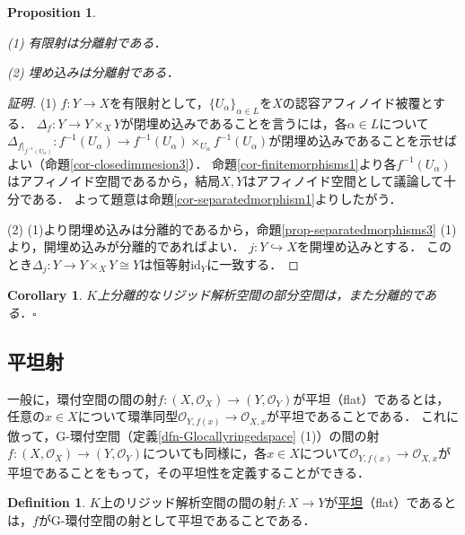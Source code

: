 \documentclass[a4paper,12pt, dvipdfmx]{jsbook}
\def\O{\mathscr{O}}
\def\id{\mathrm{id}}
\theoremstyle{plain}
\newtheorem{prop}[thm]{\bfseries Proposition}
\newtheorem{cor}[thm]{\bfseries Corollary}
\theoremstyle{definition}
\newtheorem{dfn}[thm]{\bfseries Definition}
\begin{document}
\begin{prop}\label{prop-separatedmorphisms4}{\rm
(1) 有限射は分離射である．

(2) 埋め込みは分離射である．}
\end{prop}

\begin{proof}[証明]
(1) $f\colon Y\rightarrow X$を有限射として，$\{U_{\alpha}\}_{\alpha\in L}$を$X$の認容アフィノイド被覆とする．
$\Delta_f\colon Y\rightarrow Y\times_XY$が閉埋め込みであることを言うには，各$\alpha\in L$について$\Delta_{f|_{f^{-1}(U_{\alpha})}}\colon f^{-1}(U_{\alpha})\rightarrow f^{-1}(U_{\alpha})\times_{U_{\alpha}}f^{-1}(U_{\alpha})$が閉埋め込みであることを示せばよい（命題\ref{cor-closedimmesion3}）．
命題\ref{cor-finitemorphisms1}より各$f^{-1}(U_{\alpha})$はアフィノイド空間であるから，結局$X,Y$はアフィノイド空間として議論して十分である．
よって題意は命題\ref{cor-separatedmorphism1}よりしたがう．

(2) (1)より閉埋め込みは分離的であるから，命題\ref{prop-separatedmorphisms3} (1)より，開埋め込みが分離的であればよい．
$j\colon Y\hookrightarrow X$を開埋め込みとする．
このとき$\Delta_j\colon Y\rightarrow Y\times_XY\cong Y$は恒等射$\id_Y$に一致する．
\end{proof}

\begin{cor}\label{cor-separatedmorphisms4}{\rm
$K$上分離的なリジッド解析空間の部分空間は，また分離的である．}\hfill$\square$
\end{cor}

\subsection{平坦射}\label{sub-flatmorphisms}
一般に，環付空間の間の射$f\colon (X,\O_X)\rightarrow (Y,\O_Y)$が平坦（flat）であるとは，任意の$x\in X$について環準同型$\O_{Y,f(x)}\rightarrow\O_{X,x}$が平坦であることである．
これに倣って，G-環付空間（定義\ref{dfn-Glocallyringedspace} (1)）の間の射$f\colon (X,\O_X)\rightarrow (Y,\O_Y)$についても同様に，各$x\in X$について$\O_{Y,f(x)}\rightarrow\O_{X,x}$が平坦であることをもって，その平坦性を定義することができる．

\begin{dfn}\label{dfn-flatmorphisms}{\rm 
$K$上のリジッド解析空間の間の射$f\colon X\rightarrow Y$が\underline{平坦}（flat）であるとは，$f$がG-環付空間の射として平坦であることである．}
\end{dfn}
\end{document}
